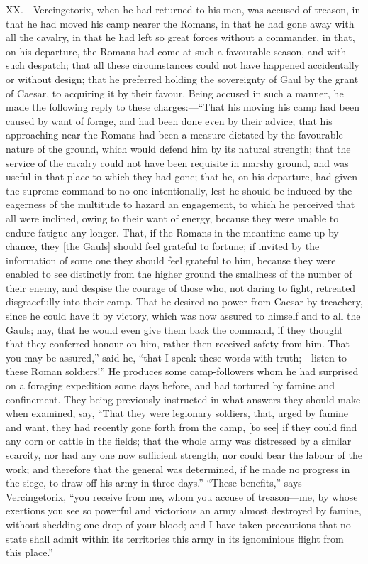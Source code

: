 XX.—Vercingetorix, when he had returned to his men, was accused of
treason, in that he had moved his camp nearer the Romans, in that he had
gone away with all the cavalry, in that he had left so great forces
without a commander, in that, on his departure, the Romans had come at
such a favourable season, and with such despatch; that all these
circumstances could not have happened accidentally or without design;
that he preferred holding the sovereignty of Gaul by the grant of
Caesar, to acquiring it by their favour. Being accused in such a manner,
he made the following reply to these charges:—``That his moving his camp
had been caused by want of forage, and had been done even by their
advice; that his approaching near the Romans had been a measure dictated
by the favourable nature of the ground, which would defend him by its
natural strength; that the service of the cavalry could not have been
requisite in marshy ground, and was useful in that place to which they
had gone; that he, on his departure, had given the supreme command to no
one intentionally, lest he should be induced by the eagerness of the
multitude to hazard an engagement, to which he perceived that all were
inclined, owing to their want of energy, because they were unable to
endure fatigue any longer. That, if the Romans in the meantime came up
by chance, they [the Gauls] should feel grateful to fortune; if invited
by the information of some one they should feel grateful to him, because
they were enabled to see distinctly from the higher ground the smallness
of the number of their enemy, and despise the courage of those who, not
daring to fight, retreated disgracefully into their camp. That he
desired no power from Caesar by treachery, since he could have it by
victory, which was now assured to himself and to all the Gauls; nay,
that he would even give them back the command, if they thought that they
conferred honour on him, rather then received safety from him. That you
may be assured,'' said he, ``that I speak these words with truth;—listen
to these Roman soldiers!'' He produces some camp-followers whom he had
surprised on a foraging expedition some days before, and had tortured by
famine and confinement. They being previously instructed in what answers
they should make when examined, say, ``That they were legionary soldiers,
that, urged by famine and want, they had recently gone forth from the
camp, [to see] if they could find any corn or cattle in the fields; that
the whole army was distressed by a similar scarcity, nor had any one now
sufficient strength, nor could bear the labour of the work; and
therefore that the general was determined, if he made no progress in the
siege, to draw off his army in three days.'' ``These benefits,'' says
Vercingetorix, ``you receive from me, whom you accuse of treason—me, by
whose exertions you see so powerful and victorious an army almost
destroyed by famine, without shedding one drop of your blood; and I have
taken precautions that no state shall admit within its territories this
army in its ignominious flight from this place.''

